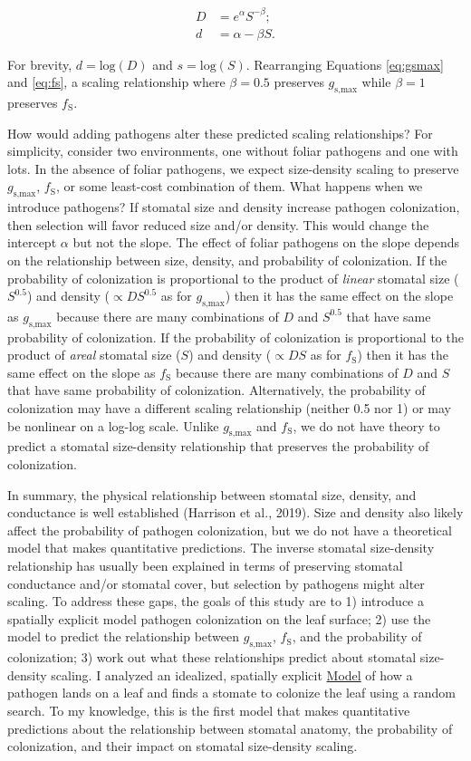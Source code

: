 \documentclass[utf8]{frontiersSCNS}
\newcommand{\fs}{$f_\text{S}$}
\newcommand{\gsmax}{$g_\text{s,max}$}
\begin{document}
\begin{align}
  D & = e ^ \alpha S ^ {-\beta}; \\
  d & = \alpha - \beta S.
\end{align}

For brevity, \(d = \text{log}(D)\) and \(s = \text{log}(S)\).
Rearranging Equations \ref{eq:gsmax} and \ref{eq:fs}, a scaling
relationship where \(\beta = 0.5\) preserves \gsmax{} while
\(\beta = 1\) preserves \fs.

How would adding pathogens alter these predicted scaling relationships?
For simplicity, consider two environments, one without foliar pathogens
and one with lots. In the absence of foliar pathogens, we expect
size-density scaling to preserve \gsmax{}, \fs{}, or some least-cost
combination of them. What happens when we introduce pathogens? If
stomatal size and density increase pathogen colonization, then selection
will favor reduced size and/or density. This would change the intercept
\(\alpha\) but not the slope. The effect of foliar pathogens on the
slope depends on the relationship between size, density, and probability
of colonization. If the probability of colonization is proportional to
the product of \emph{linear} stomatal size (\(S ^ {0.5}\)) and density
(\(\propto D S ^ {0.5}\) as for \gsmax) then it has the same effect on
the slope as \gsmax{} because there are many combinations of \(D\) and
\(S ^ {0.5}\) that have same probability of colonization. If the
probability of colonization is proportional to the product of
\emph{areal} stomatal size (\(S\)) and density (\(\propto D S\) as for
\fs) then it has the same effect on the slope as \fs{} because there are
many combinations of \(D\) and \(S\) that have same probability of
colonization. Alternatively, the probability of colonization may have a
different scaling relationship (neither 0.5 nor 1) or may be nonlinear
on a log-log scale. Unlike \gsmax{} and \fs{}, we do not have theory to
predict a stomatal size-density relationship that preserves the
probability of colonization.

In summary, the physical relationship between stomatal size, density,
and conductance is well established (Harrison et al., 2019). Size and
density also likely affect the probability of pathogen colonization, but
we do not have a theoretical model that makes quantitative predictions.
The inverse stomatal size-density relationship has usually been
explained in terms of preserving stomatal conductance and/or stomatal
cover, but selection by pathogens might alter scaling. To address these
gaps, the goals of this study are to 1) introduce a spatially explicit
model pathogen colonization on the leaf surface; 2) use the model to
predict the relationship between \gsmax, \fs, and the probability of
colonization; 3) work out what these relationships predict about
stomatal size-density scaling. I analyzed an idealized, spatially
explicit \protect\hyperlink{model}{Model} of how a pathogen lands on a
leaf and finds a stomate to colonize the leaf using a random search. To
my knowledge, this is the first model that makes quantitative
predictions about the relationship between stomatal anatomy, the
probability of colonization, and their impact on stomatal size-density
scaling.
\end{document}
